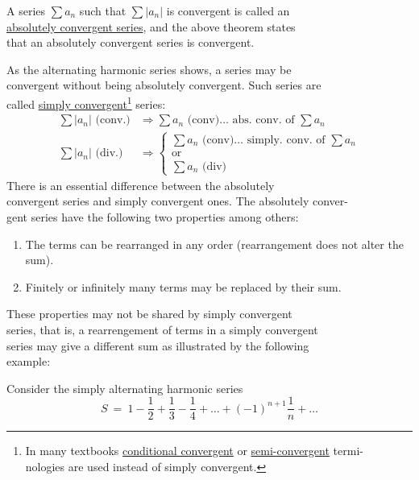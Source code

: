 \documentclass[11pt]{amsbook}
\begin{document}
A series $\sum a_{n}$ such that $\sum|a_{n}|$ is convergent is called an
\\\underline{absolutely convergent series}, and the above theorem states \\that an absolutely convergent series is convergent.

As the alternating harmonic series shows, a series may be
\\convergent without being absolutely convergent. Such series are
\\called \underline{simply convergent}\footnote{In many textbooks \underline{conditional convergent} or \underline{semi-convergent} termi-
\\nologies are used instead of simply convergent.} series:
\begin{align*}
    \sum|a_{n}| \text{ (conv.)} 
        &\Longrightarrow \sum a_{n} \text{ (conv)} \dots \text{ abs. conv. of  } \sum a_{n}\\
    \sum|a_{n}| \text{ (div.)} 
        &\Longrightarrow \left\{
            \begin{array}{ll}
             \sum a_{n} \text{ (conv)} \dots \text{ simply. conv. of  } \sum a_{n}\\
             \text{or}\\
             \sum a_{n} \text{ (div)} 
    \end{array}
    \right.    
\end{align*}
There is an essential difference between the absolutely
\\convergent series and simply convergent ones. The absolutely conver-
\\gent series have the following two properties among others:

\begin{enumerate}
    \item The terms can be rearranged in any order (rearrangement does not alter the sum).
    \item Finitely or infinitely many terms may be replaced by their sum.
\end{enumerate}

These properties may not be shared by simply convergent 
\\series, that is, a rearrengement of terms in a simply convergent
\\series may give a different sum as illustrated by the following
\\example:

Consider the simply alternating harmonic series
\[
    S\:=\: 1 - \frac{1}{2} + \frac{1}{3} - \frac{1}{4} + \dots + (-1)^{n+1} \frac{1}{n} + \dots
\]
\end{document}
